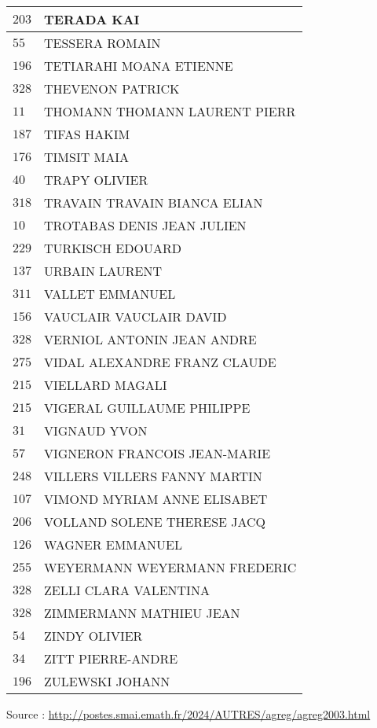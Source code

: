 \begin{xltabular}{\linewidth}{|l|X|}
    \hline
    $203$ & TERADA KAI \\
    \hline
    $55$ & TESSERA ROMAIN \\
    \hline
    $196$ & TETIARAHI MOANA ETIENNE \\
    \hline
    $328$ & THEVENON PATRICK \\
    \hline
    $11$ & THOMANN THOMANN LAURENT PIERR \\
    \hline
    $187$ & TIFAS HAKIM \\
    \hline
    $176$ & TIMSIT MAIA \\
    \hline
    $40$ & TRAPY OLIVIER \\
    \hline
    $318$ & TRAVAIN TRAVAIN BIANCA ELIAN \\
    \hline
    $10$ & TROTABAS DENIS JEAN JULIEN \\
    \hline
    $229$ & TURKISCH EDOUARD \\
    \hline
    $137$ & URBAIN LAURENT \\
    \hline
    $311$ & VALLET EMMANUEL \\
    \hline
    $156$ & VAUCLAIR VAUCLAIR DAVID \\
    \hline
    $328$ & VERNIOL ANTONIN JEAN ANDRE \\
    \hline
    $275$ & VIDAL ALEXANDRE FRANZ CLAUDE \\
    \hline
    $215$ & VIELLARD MAGALI \\
    \hline
    $215$ & VIGERAL GUILLAUME PHILIPPE \\
    \hline
    $31$ & VIGNAUD YVON \\
    \hline
    $57$ & VIGNERON FRANCOIS JEAN-MARIE \\
    \hline
    $248$ & VILLERS VILLERS FANNY MARTIN \\
    \hline
    $107$ & VIMOND MYRIAM ANNE ELISABET \\
    \hline
    $206$ & VOLLAND SOLENE THERESE JACQ \\
    \hline
    $126$ & WAGNER EMMANUEL \\
    \hline
    $255$ & WEYERMANN WEYERMANN FREDERIC \\
    \hline
    $328$ & ZELLI CLARA VALENTINA \\
    \hline
    $328$ & ZIMMERMANN MATHIEU JEAN \\
    \hline
    $54$ & ZINDY OLIVIER \\
    \hline
    $34$ & ZITT PIERRE-ANDRE \\
    \hline
    $196$ & ZULEWSKI JOHANN \\
    \hline
  \end{xltabular}

  \begin{flushright}
    {\tiny Source : \url{http://postes.smai.emath.fr/2024/AUTRES/agreg/agreg2003.html}}
  \end{flushright}

